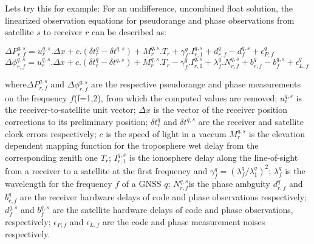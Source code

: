 \begin{itemize}
\end{itemize}

Lets try this for example:
For an undifference, uncombined float solution, the linearized observation equations for pseudorange and phase observations from satellite $s$ to receiver $r$ can be described as:

\begin{math}
\Delta P_{r,f}^{q,s} = u_r^{q,s} . \Delta x + c . (\delta t_r^q - \delta t^{q,s}) + M_r^{q,s} . T_r + \gamma_f^q . I_{r,1}^{q,s} + d_{r,f}^q - d_f^{q,s} + \epsilon_{P,f}^q
\end{math}\\
\begin{math}
\Delta\phi_{r,f}^{q,s} = u_r^{q,s} . \Delta x + c . (\delta t_r^q - \delta t^{q,s}) + M_r^{q,s} . T_r - \gamma_f^q . I_{r,1}^{q,s} + \lambda_f^q . N_{r,f}^{q,s} + b_{r,f}^q - b_f^{q,s} + \epsilon_{L,f}^q 
\end{math}

where$\Delta P_{r,f}^{q,s}$ and $\Delta\phi_{r,f}^{q,s}$ are the respective pseudorange and phase measurements on the frequency $f$(f=1,2), from which the computed values are removed;
$u_r^{q,s}$ is the receiver-to-satellite unit vector;
$\Delta x$ is the vector of the receiver position corrections to its preliminary position; 
$\delta t_r^q$ and $\delta t^{q,s}$ are the receiver and satellite clock errors respectively;
$c$ is the speed of light in a vaccum
$M_r^{q,s}$ is the elevation dependent mapping function for the troposphere wet delay from the corresponding zenith one $T_r$;
$I_{r,1}^{q,s}$ is the ionosphere delay along the line-of-sight from a receiver to a satellite at the first frequency and $\gamma_f^q = (\lambda_f^q / \lambda_1^q)^2$;
$\lambda_f^q$ is the wavelength for the frequency $f$ of a GNSS $q$;
$N_{r,f}^{q,s}$is the phase ambguity 
$d_{r,f}^q$ and $b_{r,f}^q$ are the receiver hardware delays of code and phase observations respectively;
$d_f^{q,s}$ and $b_f^{q,s}$ are the satellite hardware delays of code and phase observations, respectively;
$\epsilon_{P,f}$ and $\epsilon_{L,f}$ are the code and phase measurement noises respectively. 

